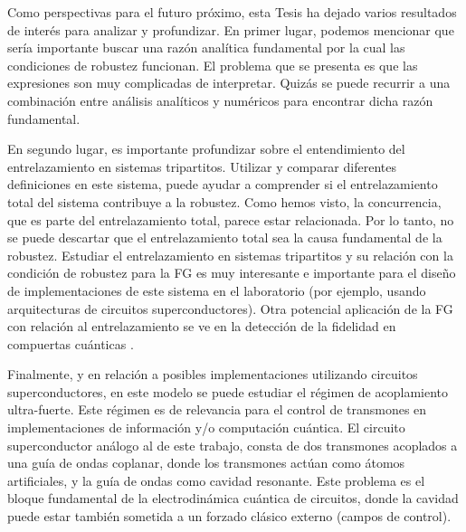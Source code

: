 Como perspectivas para el futuro próximo, esta Tesis ha dejado varios resultados de interés para analizar y profundizar. En primer lugar, podemos mencionar que sería importante buscar una razón analítica fundamental por la cual las condiciones de robustez funcionan. El problema que se presenta es que  las expresiones son muy complicadas de interpretar. Quizás se puede recurrir a una  combinación entre análisis analíticos y numéricos para encontrar dicha razón fundamental. 

En segundo lugar, es importante profundizar sobre el entendimiento del entrelazamiento en sistemas tripartitos. Utilizar y comparar diferentes definiciones en este sistema, puede ayudar a comprender si el entrelazamiento total del sistema contribuye a la robustez. Como hemos visto, la concurrencia, que es parte del entrelazamiento total, parece estar relacionada. Por lo tanto, no se puede descartar que el entrelazamiento total sea la causa fundamental de la robustez. Estudiar el entrelazamiento en sistemas tripartitos y su relación con la condición de robustez para la FG es muy interesante e importante para el diseño de implementaciones de este sistema en el laboratorio (por ejemplo, usando arquitecturas de circuitos superconductores). Otra potencial aplicación de la FG con relación al entrelazamiento se ve en la detección de la fidelidad en compuertas cuánticas \cite{Ganesh2025}.

Finalmente, y en relación a posibles implementaciones utilizando circuitos superconductores, en este modelo se puede estudiar el régimen de acoplamiento ultra-fuerte. Este régimen es de relevancia para el control de transmones en implementaciones de información y/o  computación cuántica. El circuito superconductor análogo al de este trabajo, consta de dos transmones acoplados a una guía de ondas coplanar, donde los transmones actúan como átomos artificiales, y la guía de ondas como cavidad resonante. Este problema es el bloque fundamental de la electrodinámica cuántica de circuitos, donde la cavidad puede estar también sometida a un forzado clásico externo (campos de control).


